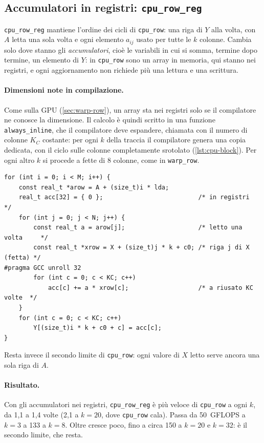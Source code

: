\documentclass[11pt,a4paper]{article}
\begin{document}
\subsection{Accumulatori in registri: \texttt{cpu\_row\_reg}}\label{sec:cpu-block}

\texttt{cpu\_row\_reg} mantiene l'ordine dei cicli di \texttt{cpu\_row}: una
riga di $Y$ alla volta, con $A$ letta una sola volta e ogni elemento $a_{ij}$
usato per tutte le $k$ colonne. Cambia solo dove stanno gli
\emph{accumulatori}, cioè le variabili in cui si somma, termine dopo termine,
un elemento di $Y$: in \texttt{cpu\_row} sono un array in memoria, qui stanno
nei registri, e ogni aggiornamento non richiede più una lettura e una scrittura.

\paragraph{Dimensioni note in compilazione.} Come sulla GPU
(\cref{sec:warp-row}), un array sta nei registri solo se il compilatore ne
conosce la dimensione. Il calcolo è quindi scritto in una funzione
\texttt{always\_inline}, che il compilatore deve espandere, chiamata con il
numero di colonne $K_C$ costante: per ogni $k$ della traccia il compilatore
genera una copia dedicata, con il ciclo sulle colonne completamente srotolato
(\cref{lst:cpu-block}). Per ogni altro $k$ si procede a fette di 8 colonne,
come in \texttt{warp\_row}.

\begin{lstlisting}[caption={Ciclo principale di \texttt{cpu\_row\_reg} (\texttt{kernel\_cpu\_row\_reg.c}).}, label={lst:cpu-block}]
for (int i = 0; i < M; i++) {
    const real_t *arow = A + (size_t)i * lda;
    real_t acc[32] = { 0 };                          /* in registri         */
    for (int j = 0; j < N; j++) {
        const real_t a = arow[j];                    /* letto una volta     */
        const real_t *xrow = X + (size_t)j * k + c0; /* riga j di X (fetta) */
#pragma GCC unroll 32
        for (int c = 0; c < KC; c++)
            acc[c] += a * xrow[c];                   /* a riusato KC volte  */
    }
    for (int c = 0; c < KC; c++)
        Y[(size_t)i * k + c0 + c] = acc[c];
}
\end{lstlisting}

Resta invece il secondo limite di \texttt{cpu\_row}: ogni valore di $X$ letto
serve ancora una sola riga di $A$.

\paragraph{Risultato.} Con gli accumulatori nei registri, \texttt{cpu\_row\_reg} è
più veloce di \texttt{cpu\_row} a ogni $k$, da 1,1 a 1,4 volte (2,1 a $k = 20$,
dove \texttt{cpu\_row} cala). Passa da 50~GFLOPS a $k = 3$ a 133 a $k = 8$.
Oltre cresce poco, fino a circa 150 a $k = 20$ e $k = 32$: è il secondo limite,
che resta.
\end{document}
